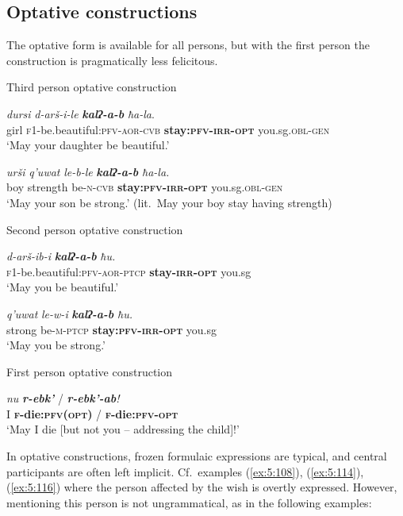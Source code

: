 ﻿\documentclass[output=paper]{langsci/langscibook}
\begin{document}
\subsection{Optative constructions}\label{optative-constructions}

The optative form is available for all persons, but with the first
person the construction is pragmatically less felicitous.

Third person optative construction

\ea %
\gll \emph{dursi} \emph{d-arš-i-le} \emph{\textbf{kalʔ-a-b}} \emph{ħa-la}.\\
 girl \textsc{f1}-be.beautiful:\textsc{pfv}-\textsc{aor}-\textsc{cvb} \textbf{stay:\textsc{pfv}-\textsc{irr}-\textsc{opt}} you.sg.\textsc{obl}-\textsc{gen}\\
\glt `May your daughter be beautiful.'

\ex %
\gll \emph{urši} \emph{q'uwat } \emph{le-b-le} \emph{\textbf{kalʔ-a-b}} \emph{ħa-la.}\\
 boy strength be-\textsc{n}-\textsc{cvb} \textbf{stay:\textsc{pfv}-\textsc{irr}-\textsc{opt}} you.sg.\textsc{obl}-\textsc{gen}\\
\glt `May your son be strong.' (lit.\ May your boy stay having strength)
\z

Second person optative construction

\ea %
\gll \emph{d-arš-ib-i} \emph{\textbf{kalʔ-a-b}} \emph{ħu.}\\
 \textsc{f1}-be.beautiful:\textsc{pfv}-\textsc{aor}-\textsc{ptcp} \textbf{stay-\textsc{irr}-\textsc{opt}} you.sg\\
\glt `May you be beautiful.'

\ex %
\gll \emph{q'uwat} \emph{le-w-i} \emph{\textbf{kalʔ-a-b}} \emph{ħu.}\\
 strong be-\textsc{m}-\textsc{ptcp} \textbf{stay:\textsc{pfv}-\textsc{irr}-\textsc{opt}} you.sg\\
\glt `May you be strong.'
\z

First person optative construction

\ea %
\gll \emph{nu} \emph{\textbf{r-ebk'}} / \emph{\textbf{r-ebk'-ab}!}\\
 I \textbf{\textsc{f}-die:\textsc{pfv}(\textsc{opt})} / \textbf{\textsc{f}-die:\textsc{pfv}-\textsc{opt}}\\
\glt `May I die [but not you – addressing the child]!'
\z

In optative constructions, frozen formulaic expressions are typical, and central
participants are often left implicit. Cf.\ examples (\ref{ex:5:108}), (\ref{ex:5:114}), (\ref{ex:5:116})
where the person affected by the wish is overtly expressed.
However, mentioning this person is not ungrammatical, as in the
following examples:
\end{document}
